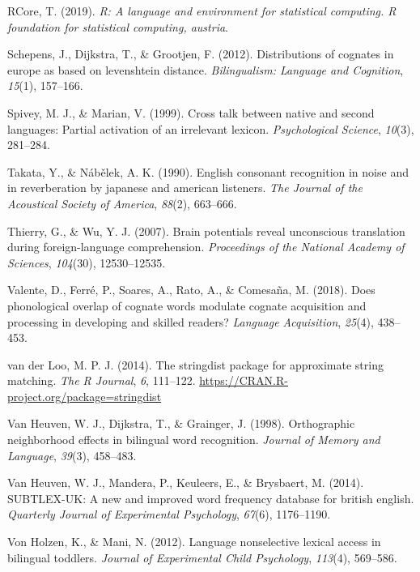 \documentclass[
]{article}
\newlength{\cslhangindent}
\newenvironment{CSLReferences}[2] %
 {\begin{list}{}{%
  \setlength{\itemindent}{0pt}
  \setlength{\leftmargin}{0pt}
  \setlength{\parsep}{0pt}
  \ifodd #1
   \setlength{\leftmargin}{\cslhangindent}
   \setlength{\itemindent}{-1\cslhangindent}
  \fi
  \setlength{\itemsep}{#2\baselineskip}}}
 {\end{list}}
\begin{document}
\begin{CSLReferences}{1}{0}
RCore, T. (2019). \emph{R: A language and environment for statistical
computing. R foundation for statistical computing, austria}.

Schepens, J., Dijkstra, T., \& Grootjen, F. (2012). Distributions of
cognates in europe as based on levenshtein distance. \emph{Bilingualism:
Language and Cognition}, \emph{15}(1), 157--166.

Spivey, M. J., \& Marian, V. (1999). Cross talk between native and
second languages: Partial activation of an irrelevant lexicon.
\emph{Psychological Science}, \emph{10}(3), 281--284.

Takata, Y., \& Nábělek, A. K. (1990). English consonant recognition in
noise and in reverberation by japanese and american listeners. \emph{The
Journal of the Acoustical Society of America}, \emph{88}(2), 663--666.

Thierry, G., \& Wu, Y. J. (2007). Brain potentials reveal unconscious
translation during foreign-language comprehension. \emph{Proceedings of
the National Academy of Sciences}, \emph{104}(30), 12530--12535.

Valente, D., Ferré, P., Soares, A., Rato, A., \& Comesaña, M. (2018).
Does phonological overlap of cognate words modulate cognate acquisition
and processing in developing and skilled readers? \emph{Language
Acquisition}, \emph{25}(4), 438--453.

van der Loo, M. P. J. (2014). The stringdist package for approximate
string matching. \emph{The {R} {J}ournal}, \emph{6}, 111--122.
\url{https://CRAN.R-project.org/package=stringdist}

Van Heuven, W. J., Dijkstra, T., \& Grainger, J. (1998). Orthographic
neighborhood effects in bilingual word recognition. \emph{Journal of
Memory and Language}, \emph{39}(3), 458--483.

Van Heuven, W. J., Mandera, P., Keuleers, E., \& Brysbaert, M. (2014).
SUBTLEX-UK: A new and improved word frequency database for british
english. \emph{Quarterly Journal of Experimental Psychology},
\emph{67}(6), 1176--1190.

Von Holzen, K., \& Mani, N. (2012). Language nonselective lexical access
in bilingual toddlers. \emph{Journal of Experimental Child Psychology},
\emph{113}(4), 569--586.


\end{CSLReferences}
\end{document}
